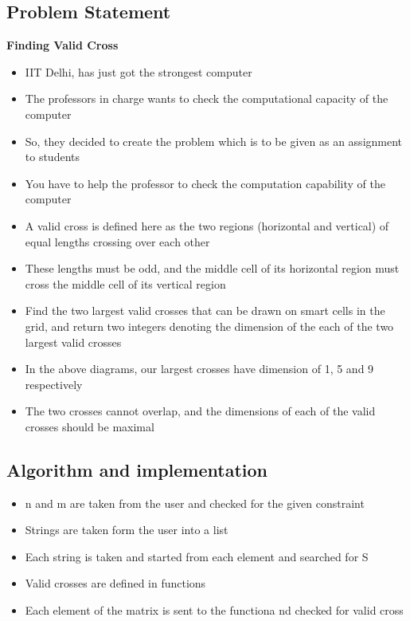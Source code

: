 \documentclass[10pt]{article}
\begin{document}
\subsection{Problem Statement}
\textbf{Finding Valid Cross}
\begin{itemize}
		\item IIT Delhi, has just got the strongest computer
		\item The professors in charge wants to check the computational capacity of the computer
		\item So, they decided to create the problem which is to be given as an assignment to students​
		\item You have to help the professor to check the computation capability of the computer
		\item A valid cross is defined here as the two regions (horizontal and vertical) of equal lengths crossing over each other
		\item These lengths must be odd, and the middle cell of its horizontal region must cross the middle cell of its vertical region
		\item Find the two largest valid crosses that can be drawn on smart cells in the grid, and return two integers denoting the dimension of the each of the two largest valid crosses
		\item In the above diagrams, our largest crosses have dimension of 1,  5 and 9 respectively 
		\item The two crosses cannot overlap, and the dimensions of each of the valid crosses should be maximal
\end{itemize}

\subsection{Algorithm and implementation}

\begin{itemize}
		\item n and m are taken from the user and checked for the given constraint
		\item \cite{1} Strings are taken form the user into a list
		\item Each string is taken and started from each element and searched for S
		\item Valid crosses are defined in functions
		\item Each element of the matrix is sent to the functiona nd checked for valid cross
\end{itemize}
\end{document}
